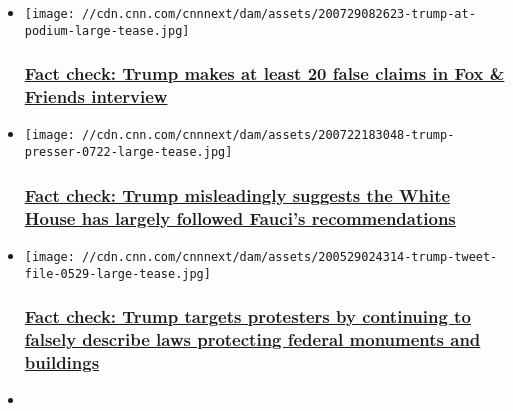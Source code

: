 \begin{itemize}
\item
  \href{/2020/08/05/politics/fact-check-trump-fox-friends-pandemic-biden-protests/index.html}{}

  \texttt{[image: //cdn.cnn.com/cnnnext/dam/assets/200729082623-trump-at-podium-large-tease.jpg]}

  \hypertarget{fact-check-trump-makes-at-least-20-false-claims-in-fox--friends-interview}{%
  \subsubsection{\texorpdfstring{\href{/2020/08/05/politics/fact-check-trump-fox-friends-pandemic-biden-protests/index.html}{Fact
  check: Trump makes at least 20 false claims in Fox \& Friends
  interview}}{Fact check: Trump makes at least 20 false claims in Fox \& Friends interview}}\label{fact-check-trump-makes-at-least-20-false-claims-in-fox--friends-interview}}
\item
  \href{/2020/07/29/politics/fact-check-trump-misleading-followed-fauci-recommendations/index.html}{}

  \texttt{[image: //cdn.cnn.com/cnnnext/dam/assets/200722183048-trump-presser-0722-large-tease.jpg]}

  \hypertarget{fact-check-trump-misleadingly-suggests-the-white-house-has-largely-followed-faucis-recommendations}{%
  \subsubsection{\texorpdfstring{\href{/2020/07/29/politics/fact-check-trump-misleading-followed-fauci-recommendations/index.html}{Fact
  check: Trump misleadingly suggests the White House has largely
  followed Fauci's
  recommendations}}{Fact check: Trump misleadingly suggests the White House has largely followed Fauci's recommendations}}\label{fact-check-trump-misleadingly-suggests-the-white-house-has-largely-followed-faucis-recommendations}}
\item
  \href{/2020/07/28/politics/trump-monument-act-prison-vandalism-fact-check/index.html}{}

  \texttt{[image: //cdn.cnn.com/cnnnext/dam/assets/200529024314-trump-tweet-file-0529-large-tease.jpg]}

  \hypertarget{fact-check-trump-targets-protesters-by-continuing-to-falsely-describe-laws-protecting-federal-monuments-and-buildings}{%
  \subsubsection{\texorpdfstring{\href{/2020/07/28/politics/trump-monument-act-prison-vandalism-fact-check/index.html}{Fact
  check: Trump targets protesters by continuing to falsely describe laws
  protecting federal monuments and
  buildings}}{Fact check: Trump targets protesters by continuing to falsely describe laws protecting federal monuments and buildings}}\label{fact-check-trump-targets-protesters-by-continuing-to-falsely-describe-laws-protecting-federal-monuments-and-buildings}}
\item
  \href{/2020/07/31/politics/mail-voting-verification-stephen-miller-fact-check/index.html}{}


\end{itemize}
